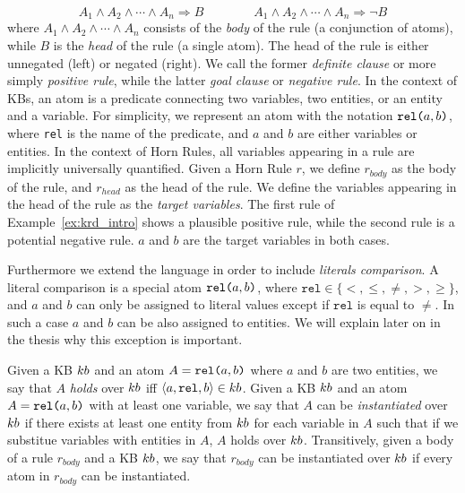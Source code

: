 \begin{equation*}
A_1 \wedge A_2 \wedge \cdots \wedge A_n \Rightarrow B \qquad \qquad A_1 \wedge A_2 \wedge \cdots \wedge A_n \Rightarrow \neg B
\end{equation*}
where $A_1 \wedge A_2 \wedge \cdots \wedge A_n$ consists of the \emph{body} of the rule (a conjunction of atoms), while $B$ is the \emph{head} of the rule (a single atom). The head of the rule is either unnegated (left) or negated (right). We call the former \emph{definite clause} or more simply \emph{positive rule}, while the latter \emph{goal clause} or \emph{negative rule}. In the context of KBs, an atom is a predicate connecting two variables, two entities, or an entity and a variable. For simplicity, we represent an atom with the notation $\texttt{rel(}a,b\texttt{)}$, where \texttt{rel} is the name of the predicate, and $a$ and $b$ are either variables or entities. In the context of Horn Rules, all variables appearing in a rule are implicitly universally quantified. Given a Horn Rule $r$, we define $r_{body}$ as the body of the rule, and $r_{head}$ as the head of the rule. We define the variables appearing in the head of the rule as the \emph{target variables}.
The first rule of Example~\ref{ex:krd_intro} shows a plausible positive rule, while the second rule is a potential negative rule. $a$ and $b$ are the target variables in both cases.

Furthermore we extend the language in order to include \emph{literals comparison}. A literal comparison is a special atom $\texttt{rel(}a,b\texttt{)}$, where $\texttt{rel} \in \{<,\leq,\neq,>,\geq\}$, and $a$ and $b$ can only be assigned to literal values except if $\texttt{rel}$ is equal to $\neq$. In such a case $a$ and $b$ can be also assigned to entities. We will explain later on in the thesis why this exception is important.

Given a KB ${\sc kb}$ and an atom $A=\texttt{rel(}a,b\texttt{)}$ where $a$ and $b$ are two entities, we say that $A$ \emph{holds} over ${\sc kb}$ iff $\langle a,\texttt{rel},b\rangle \in {\sc kb}$.
Given a KB ${\sc kb}$ and an atom $A=\texttt{rel(}a,b\texttt{)}$ with at least one variable, we say that $A$ can be \emph{instantiated} over ${\sc kb}$ if there exists at least one entity from ${\sc kb}$ for each variable in $A$ such that if we substitue variables with entities in $A$, $A$ holds over ${\sc kb}$. Transitively, given a body of a rule $r_{body}$ and a KB ${\sc kb}$, we say that $r_{body}$ can be instantiated over ${\sc kb}$ if every atom in $r_{body}$ can be instantiated. 


